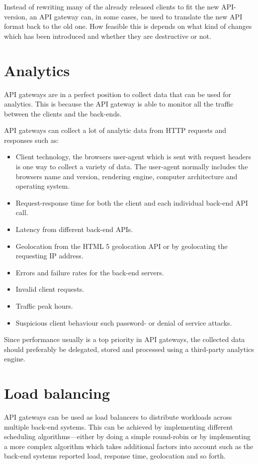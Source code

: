 \documentclass{cslthse-msc}
\begin{document}
Instead of rewriting many of the already released clients to fit the new API-version, an API gateway can, in some cases, be used to translate the new API format back to the old one. How feasible this is depends on what kind of changes which has been introduced and whether they are destructive or not.

\section{Analytics}
API gateways are in a perfect position to collect data that can be used for analytics. This is because the API gateway is able to monitor all the traffic between the clients and the back-ends. 

\vspace{5mm}

\noindent API gateways can collect a lot of analytic data from HTTP requests and responses such as:
\begin{itemize}
	\item Client technology, the browsers user-agent which is sent with request headers is one way to collect a variety of data. The user-agent normally includes the browsers name and version, rendering engine, computer architecture and operating system.
	\item Request-response time for both the client and each individual back-end API call.
	\item Latency from different back-end APIs.
	\item Geolocation from the HTML 5 geolocation API\cite{html5_geolocation} or by geolocating the requesting IP address.
	\item Errors and failure rates for the back-end servers.
	\item Invalid client requests.
	\item Traffic peak hours.
	\item Suspicious client behaviour such password- or denial of service attacks.
\end{itemize}

\noindent Since performance usually is a top priority in API gateways, the collected data should preferably be delegated, stored and processed using a third-party analytics engine.

\section{Load balancing}
API gateways can be used as load balancers to distribute workloads across multiple back-end systems. This can be achieved by implementing different scheduling algorithms---either by doing a simple round-robin or by implementing a more complex algorithm which takes additional factors into account such as the back-end systems reported load, response time, geolocation and so forth.
\end{document}
